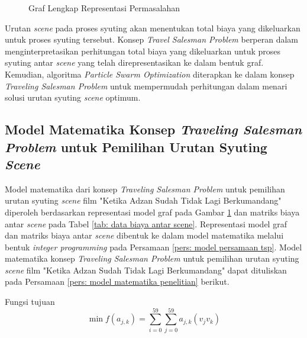 {{\begin{figure}
    \vspace{3mm}
    \caption{Graf Lengkap Representasi Permasalahan}
    \label{gam: Graf Model}
\end{figure}

Urutan \textit{scene} pada proses syuting akan menentukan total biaya yang dikeluarkan untuk proses syuting tersebut.
Konsep \textit{Travel Salesman Problem} berperan dalam menginterpretasikan perhitungan total biaya yang dikeluarkan untuk proses syuting antar \textit{scene} yang telah direpresentasikan ke dalam bentuk graf.
Kemudian, algoritma \textit{Particle Swarm Optimization} diterapkan ke dalam konsep \textit{Traveling Salesman Problem} untuk mempermudah perhitungan dalam menari solusi urutan syuting \textit{scene} optimum.
}

\vspace{-5mm}
\subsection
[Model Matematika Konsep \textit{Traveling Salesman Problem} untuk Pemilihan Urutan Syuting \textit{Scene}]
{Model Matematika Konsep \textit{Traveling Salesman Problem} untuk Pemilihan Urutan Syuting \textit{Scene}}
{\frenchspacing
Model matematika dari konsep \textit{Traveling Salesman Problem} untuk pemilihan urutan syuting \textit{scene} film "Ketika Adzan Sudah Tidak Lagi Berkumandang"
diperoleh berdasarkan representasi model graf pada Gambar \ref{gam: Graf Model} dan matriks biaya antar \textit{scene} pada Tabel \ref{tab: data biaya antar scene}.
Representasi model graf dan matriks biaya antar \textit{scene} dibentuk ke dalam model matematika melalui bentuk \textit{integer programming} pada Persamaan \ref{pers: model persamaan tsp}.
Model matematika konsep \textit{Traveling Salesman Problem} untuk pemilihan urutan syuting \textit{scene} film "Ketika Adzan Sudah Tidak Lagi Berkumandang" dapat dituliskan pada Persamaan \ref{pers: model matematika penelitian} berikut.

\noindent
Fungsi tujuan
\begin{equation}
    \label{pers: model matematika penelitian}
    \operatorname{min} f(a_{j,k}) = \sum^{59}_{i=0} \sum^{59}_{j=0} a_{j,k}(v_{j}v_{k})
\end{equation}

}}
